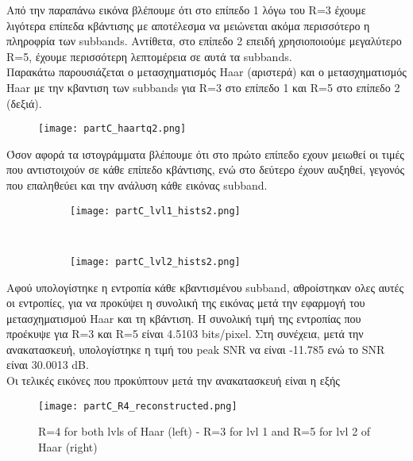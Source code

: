 \documentclass{article}
\begin{document}
	\noindent
	Από την παραπάνω εικόνα βλέπουμε ότι στο επίπεδο 1 λόγω του R=3 έχουμε λιγότερα επίπεδα κβάντισης με αποτέλεσμα να μειώνεται ακόμα περισσότερο η πληροφρία των subbands. Aντίθετα, στο επίπεδο 2 επειδή χρησιοποιούμε μεγαλύτερο R=5, έχουμε περισσότερη λεπτομέρεια σε αυτά τα subbands.\\
	
	\noindent
	Παρακάτω παρουσιάζεται ο μετασχηματισμός Haar (αριστερά) και ο μετασχηματισμός Haar με την κβαντιση των subbands για R=3 στο επίπεδο 1 και R=5 στο επίπεδο 2 (δεξιά).
		
	\begin{figure}[h!]
		\centering
		\texttt{[image: partC\_haartq2.png]}
	\end{figure}

	\pagebreak
	\noindent
	Όσον αφορά τα ιστογράμματα βλέπουμε ότι στο πρώτο επίπεδο εχουν μειωθεί οι τιμές που αντιστοιχούν σε κάθε επίπεδο κβάντισης, ενώ στο δεύτερο έχουν αυξηθεί, γεγονός που επαληθεύει και την ανάλυση κάθε εικόνας subband.
	
	\begin{figure}[h!]
		\centering
		\begin{subfigure}[t]{0.5\textwidth}
			\centering
			\texttt{[image: partC\_lvl1\_hists2.png]}
		\end{subfigure}%
		~
		\begin{subfigure}[t]{0.5\textwidth}
			\centering
			\texttt{[image: partC\_lvl2\_hists2.png]}
		\end{subfigure}
	\end{figure}

	\noindent
	Αφού υπολογίστηκε η εντροπία κάθε κβαντισμένου subband, αθροίστηκαν ολες αυτές οι εντροπίες, για να προκύψει η συνολική της εικόνας μετά την εφαρμογή του μετασχηματισμού Haar και τη κβάντιση. Η συνολική τιμή της εντροπίας που προέκυψε για R=3 και R=5 είναι 4.5103 bits/pixel. Στη συνέχεια, μετά την ανακατασκευή, υπολογίστηκε η τιμή του peak SNR να είναι -11.785 ενώ το SNR είναι 30.0013 dB.\\
	
	\noindent
	Οι τελικές εικόνες που προκύπτουν μετά την ανακατασκευή είναι η εξής
	\begin{figure}[h!]
		\centering
		\texttt{[image: partC\_R4\_reconstructed.png]}
		\caption{R=4 for both lvls of Haar (left) - R=3 for lvl 1 and R=5 for lvl 2 of Haar (right) }
	\end{figure}
\end{document}
